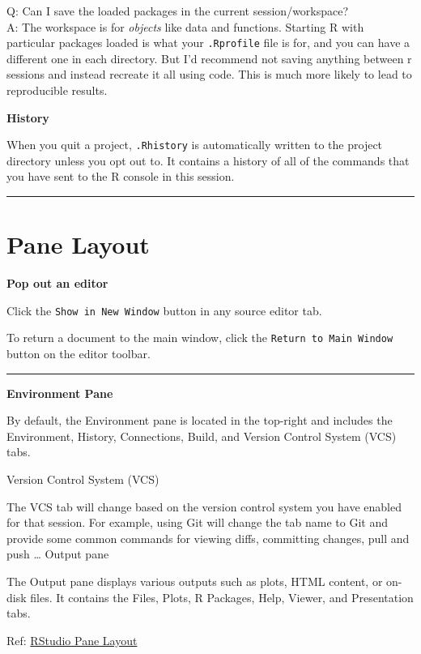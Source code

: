 \documentclass[
  a4paper,
  twoside,
  openright]{book}
\theoremstyle{definition}
\theoremstyle{definition}
\theoremstyle{definition}
\theoremstyle{definition}
\theoremstyle{remark}
\begin{document}
Q: Can I save the loaded packages in the current session/workspace?\\
A: The workspace is for \emph{objects} like data and functions. Starting R with particular packages loaded is what your \texttt{.Rprofile} file is for, and you can have a different one in each directory. But I'd recommend not saving anything between r sessions and instead recreate it all using code. This is much more likely to lead to reproducible results.

\textbf{History}

When you quit a project, \texttt{.Rhistory} is automatically written to the project directory unless you opt out to. It contains a history of all of the commands that you have sent to the R console in this session.

\begin{center}\rule{0.5\linewidth}{0.5pt}\end{center}

\section{Pane Layout}\label{pane-layout}

\textbf{Pop out an editor}

Click the \texttt{Show\ in\ New\ Window} button in any source editor tab.

To return a document to the main window, click the \texttt{Return\ to\ Main\ Window} button on the editor toolbar.

\begin{center}\rule{0.5\linewidth}{0.5pt}\end{center}

\textbf{Environment Pane}

By default, the Environment pane is located in the top-right and includes the Environment, History, Connections, Build, and Version Control System (VCS) tabs.

Version Control System (VCS)

The VCS tab will change based on the version control system you have enabled for that session. For example, using Git will change the tab name to Git and provide some common commands for viewing diffs, committing changes, pull and push \ldots{}
Output pane

The Output pane displays various outputs such as plots, HTML content, or on-disk files. It contains the Files, Plots, R Packages, Help, Viewer, and Presentation tabs.

Ref: \href{https://docs.posit.co/ide/user/ide/guide/ui/ui-panes.html\#:~:text=four\%20primary\%20panes.-,To\%20add\%20additional\%20source\%20columns\%2C\%20from\%20the\%20RStudio\%20menu\%3A\%20Global,only\%20within\%20the\%20Source\%20pane.}{RStudio Pane Layout}
\end{document}
